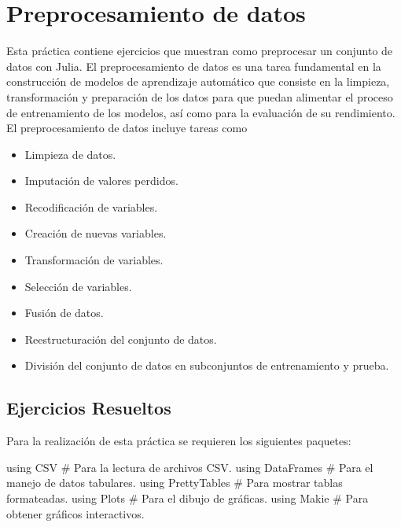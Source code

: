\documentclass[
  a4paper,
]{scrreport}
\newenvironment{Shaded}{\begin{snugshade}}{\end{snugshade}}
\newcommand{\BuiltInTok}[1]{\textcolor[rgb]{0.00,0.23,0.31}{#1}}
\newcommand{\CommentTok}[1]{\textcolor[rgb]{0.37,0.37,0.37}{#1}}
\newcommand{\ImportTok}[1]{\textcolor[rgb]{0.00,0.46,0.62}{#1}}
\providecommand{\tightlist}{%
  \setlength{\itemsep}{0pt}\setlength{\parskip}{0pt}}\usepackage{longtable,booktabs,array}
\theoremstyle{definition}
\theoremstyle{remark}
\begin{document}

\chapter{Preprocesamiento de datos}\label{preprocesamiento-de-datos}

Esta práctica contiene ejercicios que muestran como preprocesar un
conjunto de datos con Julia. El preprocesamiento de datos es una tarea
fundamental en la construcción de modelos de aprendizaje automático que
consiste en la limpieza, transformación y preparación de los datos para
que puedan alimentar el proceso de entrenamiento de los modelos, así
como para la evaluación de su rendimiento. El preprocesamiento de datos
incluye tareas como

\begin{itemize}
\tightlist
\item
  Limpieza de datos.
\item
  Imputación de valores perdidos.
\item
  Recodificación de variables.
\item
  Creación de nuevas variables.
\item
  Transformación de variables.
\item
  Selección de variables.
\item
  Fusión de datos.
\item
  Reestructuración del conjunto de datos.
\item
  División del conjunto de datos en subconjuntos de entrenamiento y
  prueba.
\end{itemize}

\section{Ejercicios Resueltos}\label{ejercicios-resueltos}

Para la realización de esta práctica se requieren los siguientes
paquetes:

\begin{Shaded}
\begin{Highlighting}[]
\ImportTok{using} \BuiltInTok{CSV}  \CommentTok{\# Para la lectura de archivos CSV.}
\ImportTok{using} \BuiltInTok{DataFrames}  \CommentTok{\# Para el manejo de datos tabulares.}
\ImportTok{using} \BuiltInTok{PrettyTables}  \CommentTok{\# Para mostrar tablas formateadas.}
\ImportTok{using} \BuiltInTok{Plots}  \CommentTok{\# Para el dibujo de gráficas.}
\ImportTok{using} \BuiltInTok{Makie}  \CommentTok{\# Para obtener gráficos interactivos.}
\end{Highlighting}
\end{Shaded}
\end{document}
